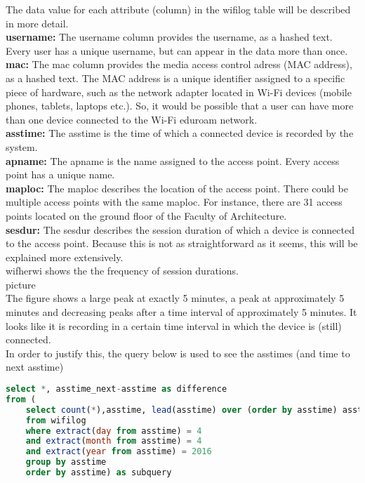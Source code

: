 The data value for each attribute (column) in the wifilog table will be described in more detail. 
\\
\textbf{username:}
The username column provides the username, as a hashed text. Every user has a unique username, but can appear in the data more than once.
\\
\textbf{mac:}
The mac column provides the media access control adress (MAC address), as a hashed text. The MAC address is a unique identifier assigned to a specific piece of hardware, such as the network adapter located in Wi-Fi devices (mobile phones, tablets, laptops etc.). So, it would be possible that a user can have more than one device connected to the Wi-Fi eduroam network.
\\
\textbf{asstime:}
The asstime is the time of which a connected device is recorded by the system.
\\
\textbf{apname:}
The apname is the name assigned to the access point. Every access point has a unique name. 
\\
\textbf{maploc:}
The maploc describes the location of the access point. There could be multiple access points with the same maploc. For instance, there are 31 access points located on the ground floor of the Faculty of Architecture.
\\
\textbf{sesdur:}
The sesdur describes the session duration of which a device is connected to the access point. Because this is not as straightforward as it seems, this will be explained more extensively.
\\
wifherwi shows the the frequency of session durations.
\\
picture
\\
The figure shows a large peak at exactly 5 minutes, a peak at approximately 5 minutes and decreasing peaks after a time interval of approximately 5 minutes. It looks like it is recording in a certain time interval in which the device is (still) connected. 
\\
In order to justify this, the query below is used to see the asstimes (and time to next asstime)
\\
\begin{lstlisting}[language=SQL]
select *, asstime_next-asstime as difference
from (
	select count(*),asstime, lead(asstime) over (order by asstime) asstime_next
	from wifilog
	where extract(day from asstime) = 4
	and extract(month from asstime) = 4
	and extract(year from asstime) = 2016
	group by asstime
	order by asstime) as subquery
\end{lstlisting}

